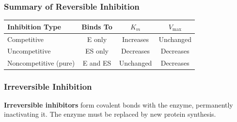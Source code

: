 \subsubsection{Summary of Reversible Inhibition}

\begin{center}
\begin{tabular}{lccc}
\toprule
\textbf{Inhibition Type} & \textbf{Binds To} & \textbf{$K_m$} & \textbf{$V_{\max}$} \\
\midrule
Competitive & E only & Increases & Unchanged \\
Uncompetitive & ES only & Decreases & Decreases \\
Noncompetitive (pure) & E and ES & Unchanged & Decreases \\
\bottomrule
\end{tabular}
\end{center}

\begin{center}
\end{center}

\subsubsection{Irreversible Inhibition}

\begin{definition}
\textbf{Irreversible inhibitors} form covalent bonds with the enzyme, permanently inactivating it. The enzyme must be replaced by new protein synthesis.
\end{definition}

